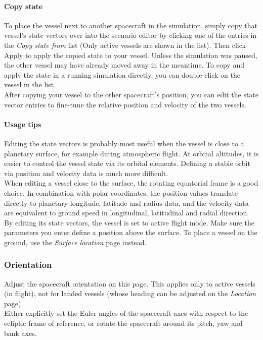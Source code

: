 \documentclass[Orbiter User Manual.tex]{subfiles}
\begin{document}
\paragraph{Copy state}
To place the vessel next to another spacecraft in the simulation, simply copy that vessel's state vectors over into the scenario editor by clicking one of the entries in the \textit{Copy state from} list (Only active vessels are shown in the list). Then click Apply to apply the copied state to your vessel. Unless the simulation was paused, the other vessel may have already moved away in the meantime. To copy and apply the state in a running simulation directly, you can double-click on the vessel in the list.\\
After copying your vessel to the other spacecraft's position, you can edit the state vector entries to fine-tune the relative position and velocity of the two vessels.

\paragraph{Usage tips}
Editing the state vectors is probably most useful when the vessel is close to a planetary surface, for example during atmospheric flight. At orbital altitudes, it is easier to control the vessel state via its orbital elements. Defining a stable orbit via position and velocity data is much more difficult.\\
When editing a vessel close to the surface, the rotating equatorial frame is a good choice. In combination with polar coordinates, the position values translate directly to planetary longitude, latitude and radius data, and the velocity data are equivalent to ground speed in longitudinal, latitudinal and radial direction.\\
By editing its state vectors, the vessel is set to active flight mode. Make sure the parameters you enter define a position above the surface. To place a vessel on the ground, use the \textit{Surface location} page instead.

\subsubsection{Orientation}
Adjust the spacecraft orientation on this page. This applies only to active vessels (in flight), not for landed vessels (whose heading can be adjusted on the \textit{Location} page).\\
Either explicitly set the Euler angles of the spacecraft axes with respect to the ecliptic frame of reference, or rotate the spacecraft around its pitch, yaw and bank axes.
\end{document}
